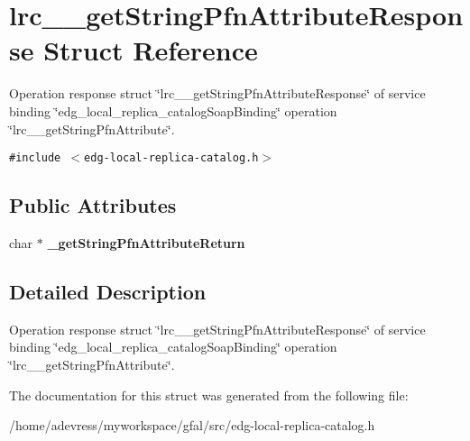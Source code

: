 \section{lrc\_\-\_\-get\-String\-Pfn\-Attribute\-Response Struct Reference}
\label{structlrc____getStringPfnAttributeResponse}
Operation response struct \char`\"{}lrc\_\-\_\-get\-String\-Pfn\-Attribute\-Response\char`\"{} of service binding \char`\"{}edg\_\-local\_\-replica\_\-catalog\-Soap\-Binding\char`\"{} operation \char`\"{}lrc\_\-\_\-get\-String\-Pfn\-Attribute\char`\"{}.  


{\tt \#include $<$edg-local-replica-catalog.h$>$}

\subsection*{Public Attributes}
\begin{CompactItemize}
\item 
char $\ast$ \textbf{\_\-get\-String\-Pfn\-Attribute\-Return}\label{structlrc____getStringPfnAttributeResponse_8dfe2586bfe2d25e41b6c4255b046dcc}

\end{CompactItemize}


\subsection{Detailed Description}
Operation response struct \char`\"{}lrc\_\-\_\-get\-String\-Pfn\-Attribute\-Response\char`\"{} of service binding \char`\"{}edg\_\-local\_\-replica\_\-catalog\-Soap\-Binding\char`\"{} operation \char`\"{}lrc\_\-\_\-get\-String\-Pfn\-Attribute\char`\"{}. 



The documentation for this struct was generated from the following file:\begin{CompactItemize}
\item 
/home/adevress/myworkspace/gfal/src/edg-local-replica-catalog.h\end{CompactItemize}
